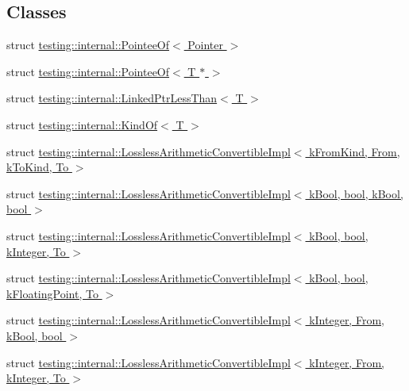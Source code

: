 \subsection*{Classes}
\begin{DoxyCompactItemize}
\item 
struct \hyperlink{structtesting_1_1internal_1_1PointeeOf}{testing\+::internal\+::\+Pointee\+Of$<$ Pointer $>$}
\item 
struct \hyperlink{structtesting_1_1internal_1_1PointeeOf_3_01T_01_5_01_4}{testing\+::internal\+::\+Pointee\+Of$<$ T $\ast$ $>$}
\item 
struct \hyperlink{structtesting_1_1internal_1_1LinkedPtrLessThan}{testing\+::internal\+::\+Linked\+Ptr\+Less\+Than$<$ T $>$}
\item 
struct \hyperlink{structtesting_1_1internal_1_1KindOf}{testing\+::internal\+::\+Kind\+Of$<$ T $>$}
\item 
struct \hyperlink{structtesting_1_1internal_1_1LosslessArithmeticConvertibleImpl}{testing\+::internal\+::\+Lossless\+Arithmetic\+Convertible\+Impl$<$ k\+From\+Kind, From, k\+To\+Kind, To $>$}
\item 
struct \hyperlink{structtesting_1_1internal_1_1LosslessArithmeticConvertibleImpl_3_01kBool_00_01bool_00_01kBool_00_01bool_01_4}{testing\+::internal\+::\+Lossless\+Arithmetic\+Convertible\+Impl$<$ k\+Bool, bool, k\+Bool, bool $>$}
\item 
struct \hyperlink{structtesting_1_1internal_1_1LosslessArithmeticConvertibleImpl_3_01kBool_00_01bool_00_01kInteger_00_01To_01_4}{testing\+::internal\+::\+Lossless\+Arithmetic\+Convertible\+Impl$<$ k\+Bool, bool, k\+Integer, To $>$}
\item 
struct \hyperlink{structtesting_1_1internal_1_1LosslessArithmeticConvertibleImpl_3_01kBool_00_01bool_00_01kFloatingPoint_00_01To_01_4}{testing\+::internal\+::\+Lossless\+Arithmetic\+Convertible\+Impl$<$ k\+Bool, bool, k\+Floating\+Point, To $>$}
\item 
struct \hyperlink{structtesting_1_1internal_1_1LosslessArithmeticConvertibleImpl_3_01kInteger_00_01From_00_01kBool_00_01bool_01_4}{testing\+::internal\+::\+Lossless\+Arithmetic\+Convertible\+Impl$<$ k\+Integer, From, k\+Bool, bool $>$}
\item 
struct \hyperlink{structtesting_1_1internal_1_1LosslessArithmeticConvertibleImpl_3_01kInteger_00_01From_00_01kInteger_00_01To_01_4}{testing\+::internal\+::\+Lossless\+Arithmetic\+Convertible\+Impl$<$ k\+Integer, From, k\+Integer, To $>$}
\item 

\end{DoxyCompactItemize}

